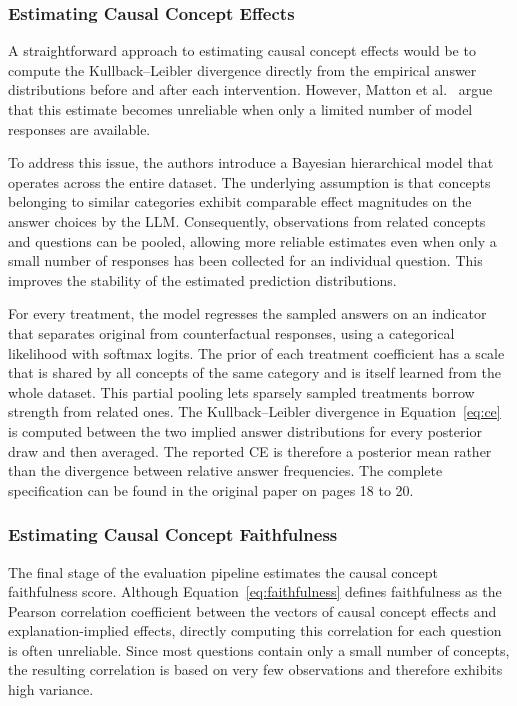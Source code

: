 \subsubsection{Estimating Causal Concept Effects}

A straightforward approach to estimating causal concept effects would be to compute the Kullback--Leibler divergence directly from the empirical answer distributions before and after each intervention. However, Matton et al.~\cite{mattonWalkTalkMeasuring2024} argue that this estimate becomes unreliable when only a limited number of model responses are available.

To address this issue, the authors introduce a Bayesian hierarchical model that operates across the entire dataset. The underlying assumption is that concepts belonging to similar categories exhibit comparable effect magnitudes on the answer choices by the LLM. Consequently, observations from related concepts and questions can be pooled, allowing more reliable estimates even when only a small number of responses has been collected for an individual question. This improves the stability of the estimated prediction distributions.

For every treatment, the model regresses the sampled answers on an indicator that separates original from counterfactual responses, using a categorical likelihood with softmax logits. The prior of each treatment coefficient has a scale that is shared by all concepts of the same category and is itself learned from the whole dataset. This partial pooling lets sparsely sampled treatments borrow strength from related ones. The Kullback--Leibler divergence in Equation~\ref{eq:ce} is computed between the two implied answer distributions for every posterior draw and then averaged. The reported CE is therefore a posterior mean rather than the divergence between relative answer frequencies. The complete specification can be found in the original paper \cite{mattonWalkTalkMeasuring2024} on pages 18 to 20.

\subsubsection{Estimating Causal Concept Faithfulness}

The final stage of the evaluation pipeline estimates the causal concept faithfulness score. Although Equation~\ref{eq:faithfulness} defines faithfulness as the Pearson correlation coefficient between the vectors of causal concept effects and explanation-implied effects, directly computing this correlation for each question is often unreliable. Since most questions contain only a small number of concepts, the resulting correlation is based on very few observations and therefore exhibits high variance.

